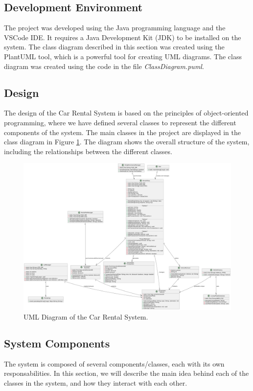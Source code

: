 \documentclass[conference]{IEEEtran}
\begin{document}
\subsection{Development Environment}
The project was developed using the Java programming language and the VSCode IDE. It requires a Java Development Kit (JDK) to be installed on the system. The class diagram described in this section was created using the PlantUML tool, which is a powerful tool for creating UML diagrams. The class diagram was created using the code in the file \textit{ClassDiagram.puml}.

\subsection{Design}
The design of the Car Rental System is based on the principles of object-oriented programming, where we have defined several classes to represent the different components of the system. The main classes in the project are displayed in the class diagram in Figure \ref{fig:uml_diagram}. The diagram shows the overall structure of the system, including the relationships between the different classes.

\begin{figure}
    \centering
    \includegraphics[width=\textwidth]{Diagram/ClassDiagram.png}
    \caption{\centering UML Diagram of the Car Rental System.}
    \label{fig:uml_diagram}
\end{figure}

\subsection{System Components}
The system is composed of several components/classes, each with its own responsabilities. In this section, we will describe the main idea behind each of the classes in the system, and how they interact with each other. 
\end{document}
